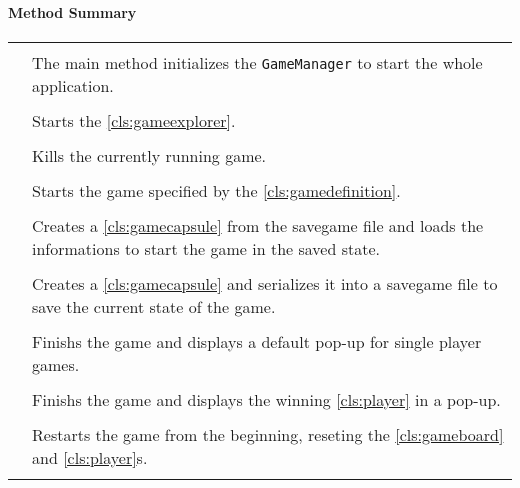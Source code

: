 \centerdash

\paragraph*{Method Summary}
\paragraph*{}
\begin{longtable}{Lp{10cm}}
	\startmethodtable
	 \\
	& The main method initializes the \texttt{GameManager} to start the whole application. \\
	 \\
	& Starts the \ref{cls:gameexplorer}. \\
	 \\
	& Kills the currently running game. \\
	 \\
	& Starts the game specified by the \ref{cls:gamedefinition}. \\
	 \\
	& Creates a \ref{cls:gamecapsule} from the savegame file and loads the informations to start the game in the saved state. \\
	 \\
	& Creates a \ref{cls:gamecapsule} and serializes it into a savegame file to save the current state of the game. \\
	 \\
	& Finishs the game and displays a default pop-up for single player games. \\
	 \\
	& Finishs the game and displays the winning \ref{cls:player} in a pop-up.  \\
	 \\
	& Restarts the game from the beginning, reseting the \ref{cls:gameboard} and \ref{cls:player}s. \\
	 \\

\end{longtable}

